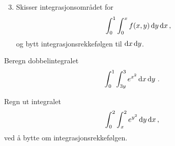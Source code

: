 
\oppgave[V2017, Oppgave 3]

\begin{enumerate}
    \setcounter{enumi}{2}
  \item Skisser integrasjonsområdet for
    \begin{equation*}
      \int_0^1 \int_0^x f(x, y) \mathop{}\! \mathrm{d} y\mathop{}\! \mathop{}\! \mathrm{d} x\mathop{}\!\,,
    \end{equation*}
    og bytt integrasjonsrekkefølgen til $\mathop{}\! \mathrm{d} x\mathop{}\! \mathop{}\! \mathrm{d} y\mathop{}\!$.
\end{enumerate}

\oppgave[K2016, Oppgave 5] Beregn dobbelintegralet
%
\begin{equation*}
  \int_0^1 \int_{3y}^3 e^{x^2} \mathop{}\! \mathrm{d} x\mathop{}\! \mathop{}\! \mathrm{d} y\mathop{}\!\,.
\end{equation*}

\oppgave[V2014, Oppgave 4] Regn ut integralet
%
\begin{equation*}
  \int_0^2 \int_x^2 e^{y^2} \mathop{}\! \mathrm{d} y\mathop{}\! \mathop{}\! \mathrm{d} x\mathop{}\!\,,
\end{equation*}
%
ved å bytte om integrasjonsrekkefølgen.

